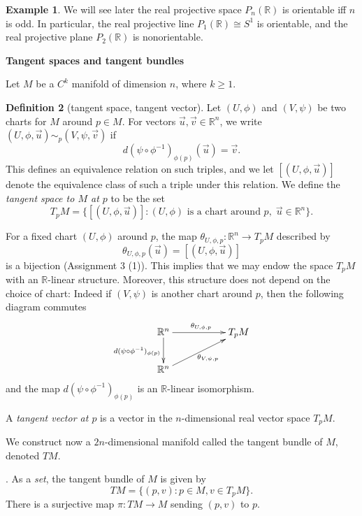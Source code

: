 \documentclass{amsart}
\numberwithin{equation}{section}
\newcommand{\bR}{\mathbb{R}}
\theoremstyle{definition}
\newtheorem{definition}{Definition} [section]
\newtheorem{example}[definition]{Example}
\theoremstyle{theorem}
\begin{document}
\begin{example}
We will see later the real projective space $P_n(\bR)$ is orientable iff $n$ is odd.
In particular, the real projective line $P_1(\bR)\cong S^1$ is orientable, and
the real projective plane $P_2(\bR)$ is nonorientable. 

\end{example}

\bigskip

\noindent
{\large \bf Tangent spaces and tangent bundles}

\medskip

Let $M$ be a $C^k$ manifold of dimension $n$, where $k\geq 1$.
\begin{definition}[tangent space, tangent vector]
Let $(U,\phi)$ and $(V,\psi)$ be two charts for $M$ around $p \in M$. 
For vectors $\vec{u}, \vec{v} \in \mathbb{R}^n$, we write $(U,\phi,\vec{u}) \sim_p (V,\psi, \vec{v})$ if 
\[
d(\psi \circ \phi^{-1})_{\phi(p)}(\vec{u}) = \vec{v}. 
\]
This defines an equivalence relation on such triples, and we let $[(U,\phi,\vec{u})]$ denote the equivalence class of such a triple under this relation. We define the {\em tangent space to $M$ at $p$} to be the set 
\[
T_pM = \{[(U,\phi,\vec{u})] : \text{$(U,\phi)$ is a chart around $p$},\; \vec{u} \in \mathbb{R}^n\}. 
\]

For a fixed chart $(U,\phi)$ around $p$, the map $\theta_{U,\phi,p} : \bR^n \to T_pM$ described by 
\[
\theta_{U,\phi,p}(\vec{u}) = [(U,\phi, \vec{u})]
\]
is a bijection (Assignment 3 (1)).  This implies that we may endow the space $T_pM$ with an $\bR$-linear structure. 
Moreover, this structure does not depend on the choice of chart: Indeed if $(V,\psi)$ is another chart around $p$, then the following diagram commutes
\[
\xymatrix{
\mathbb{R}^n \ar[rr]^{\theta_{U,\phi,p}}  \ar[d]_{d(\psi \circ \phi^{-1})_{\phi(p)}}& & T_pM \\
\mathbb{R}^n \ar[rru]_{\theta_{V,\psi,p}}
}
\]
and the map $d(\psi \circ \phi^{-1})_{\phi(p)}$ is an $\bR$-linear isomorphism. 

A {\em tangent vector at $p$} is a vector in the $n$-dimensional real vector space $T_pM$.

\end{definition}


We construct now a $2n$-dimensional manifold called the {\rm tangent bundle} of $M$, denoted $TM$. 

. As a {\em set}, the tangent bundle of $M$ is given by
\[
TM = \{(p,v) : p \in M, v \in T_pM\}.
\]
There is a surjective map $\pi : TM \to M$ sending $(p,v)$ to $p$. 
\end{document}
